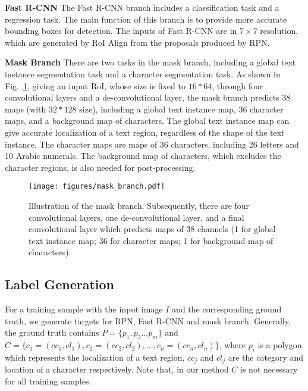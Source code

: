 \documentclass[runningheads]{llncs}
\begin{document}
\noindent\textbf{Fast R-CNN}
The Fast R-CNN branch includes a classification task and a regression task. The main function of this branch is to provide more accurate bounding boxes for detection. The inputs of Fast R-CNN are in $7 \times 7$ resolution, which are generated by RoI Align from the proposals produced by RPN.

\noindent\textbf{Mask Branch}
There are two tasks in the mask branch, including a global text instance segmentation task and a character segmentation task. As shown in Fig.~\ref{fig:mask_branch}, giving an input RoI, whose size is fixed to $16*64$, through four convolutional layers and a de-convolutional layer, the mask branch predicts 38 maps (with $32*128$ size), including a global text instance map, 36 character maps, and a background map of characters. 
The global text  instance map can give accurate localization of a text region, regardless of the shape of the text instance.
The character maps are maps of 36 characters, including 26 letters and 10 Arabic numerals. The background map of characters, which excludes the character regions, is also needed for post-processing.

\begin{figure}[!b]
\begin{center}
\texttt{[image: figures/mask\_branch.pdf]}
\end{center}
\caption{Illustration of the mask branch. Subsequently, there are four convolutional layers, one de-convolutional layer, and a final convolutional layer which predicts maps of 38 channels (1 for global text instance map; 36 for character maps; 1 for background map of characters).}
\label{fig:mask_branch}
\end{figure}

\subsection{Label Generation}
For a training sample with the input image $I$ and the corresponding ground truth,  we generate targets for RPN, Fast R-CNN and mask branch. Generally, the ground truth contains $P=\{p_{1}, p_{2}...p_{m} \}$ and $C=\{c_{1}=(cc_{1},cl_{1}),c_{2}=(cc_{2},cl_{2}), ... , c_{n}=(cc_{n},cl_{n})\}$, where $p_{i}$ is a polygon which represents the localization of a text region, $cc_{j}$ and $cl_{j}$ are the category and location of a character respectively. Note that, in our method $C$ is not necessary for all training samples. 
\end{document}
